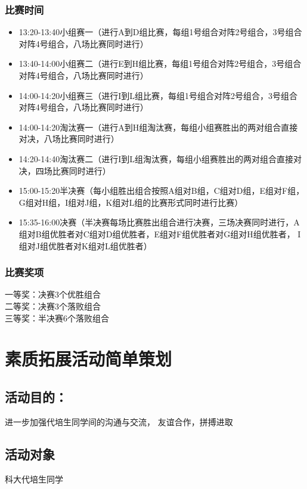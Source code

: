 \documentclass{article}
\begin{document}
\begin{CJK}{UTF8}{gbsn}
\subsubsection{比赛时间}
\begin{itemize}
	\item 13:20-13:40小组赛一（进行A到D组比赛，每组1号组合对阵2号组合，3号组合对阵4号组合，八场比赛同时进行）
	\item 13:40-14:00小组赛二（进行E到H组比赛，每组1号组合对阵2号组合，3号组合对阵4号组合，八场比赛同时进行）
	\item 14:00-14:20小组赛三（进行I到L组比赛，每组1号组合对阵2号组合，3号组合对阵4号组合，八场比赛同时进行）
	\item 14:00-14:20淘汰赛一（进行A到H组淘汰赛，每组小组赛胜出的两对组合直接对决，八场比赛同时进行）
	\item 14:20-14:40淘汰赛二（进行I到L组淘汰赛，每组小组赛胜出的两对组合直接对决，四场比赛同时进行）
	\item 15:00-15:20半决赛（每小组胜出组合按照A组对B组，C组对D组，E组对F组，G组对H组，I组对J组，K组对L组的比赛形式同时进行比赛）
	\item 15:35-16:00决赛（半决赛每场比赛胜出组合进行决赛，三场决赛同时进行，A组对B组优胜者对C组对D组优胜者，E组对F组优胜者对G组对H组优胜者，	I组对J组优胜者对K组对L组优胜者）
\end{itemize}



\subsubsection{比赛奖项}
一等奖：决赛3个优胜组合\\
二等奖：决赛3个落败组合\\
三等奖：半决赛6个落败组合\\



\section{素质拓展活动简单策划}
\subsection{活动目的：}
进一步加强代培生同学间的沟通与交流， 友谊合作，拼搏进取

\subsection{活动对象}
科大代培生同学


\end{CJK}
\end{document}
